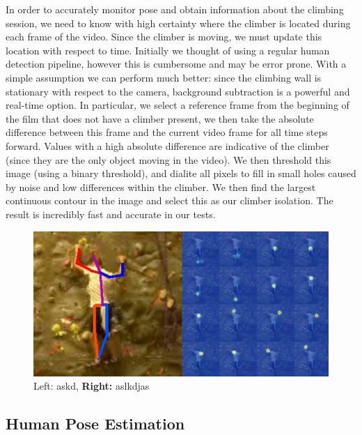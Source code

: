 \documentclass{chi2009}
\begin{document}
In order to accurately monitor pose and obtain information about the climbing session, we need to know with high certainty where the climber is located during each frame of the video. Since the climber is moving, we must update this location with respect to time. Initially we thought of using a regular human detection pipeline, however this is cumbersome and may be error prone. With a simple assumption we can perform much better: since the climbing wall is stationary with respect to the camera, background subtraction is a powerful and real-time option. In particular, we select a reference frame from the beginning of the film that does not have a climber present, we then take the absolute difference between this frame and the current video frame for all time steps forward. Values with a high absolute difference are indicative of the climber (since they are the only object moving in the video). We then threshold this image (using a binary threshold), and dialite all pixels to fill in small holes caused by noise and low differences within the climber. We then find the largest continuous contour in the image and select this as our climber isolation. The result is incredibly fast and accurate in our tests.

\begin{figure}[t]
  \centering
  \includegraphics[keepaspectratio, width=\textwidth]{figs/pose.png}
  \caption{Left: \normalfont askd, \textbf{Right:} aslkdjas}
  \label{fig:user}
\end{figure}

\subsection{Human Pose Estimation}
\end{document}
